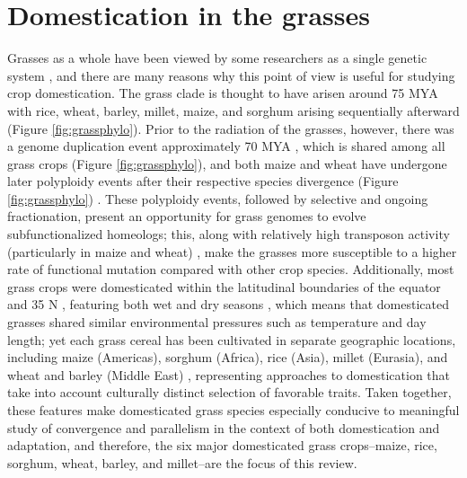 \documentclass[12pt]{article}
\begin{document}
\section*{Domestication in the grasses}
Grasses as a whole have been viewed by some researchers as a single genetic system \citep{pmid8379002, pmid11244100}, and there are many reasons why this point of view is useful for studying crop domestication.
The grass clade is thought to have arisen around 75 MYA \citep{BOUCHENAKKHELLADI2010, Kellogg2001} with rice, wheat, barley, millet, maize, and sorghum arising sequentially afterward (Figure \ref{fig:grassphylo}).
Prior to the radiation of the grasses, however, there was a genome duplication event approximately 70 MYA \citep{Paterson2004}, which is shared among all grass crops (Figure \ref{fig:grassphylo}), and both maize and wheat have undergone later polyploidy events after their respective species divergence (Figure \ref{fig:grassphylo}) \citep{Levy2002}.
These polyploidy events, followed by selective and ongoing fractionation, present an opportunity for grass genomes to evolve subfunctionalized homeologs; this, along with relatively high transposon activity (particularly in maize and wheat) \citep{Wicker2016, Lisch2001}, make the grasses more susceptible to a higher rate of functional mutation compared with other crop species.  
Additionally, most grass crops were domesticated within the latitudinal boundaries of the equator and 35 N \citep{Jain1993, Gepts2010}, featuring both wet and dry seasons \citep{Jain1993}, which means that domesticated grasses shared similar environmental pressures such as temperature and day length; yet each grass cereal has been cultivated in separate geographic locations, including maize (Americas), sorghum (Africa), rice (Asia), millet (Eurasia), and wheat and barley (Middle East) \citep{Glmin2009}, representing approaches to domestication that take into account culturally distinct selection of favorable traits.
Taken together, these features make domesticated grass species especially conducive to meaningful study of convergence and parallelism in the context of both domestication and adaptation, and therefore, the six major domesticated grass crops--maize, rice, sorghum, wheat, barley, and millet--are the focus of this review. 
\end{document}
